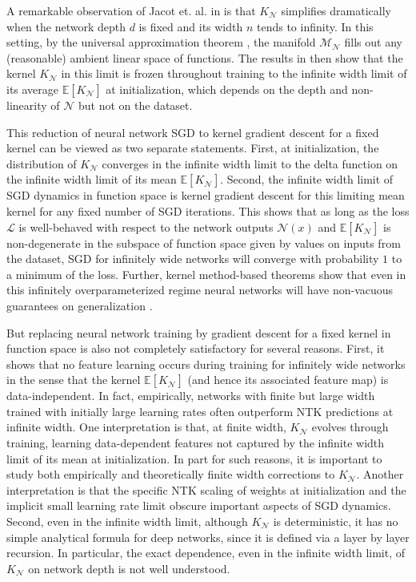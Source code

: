 \documentclass[11pt, reqno]{amsart}
\newcommand{\E}[1]{{\mathbb E}\left [#1\right]}
\newcommand{\mN}{\mathcal N}
\newcommand{\mM}{\mathcal M}
\begin{document}
A remarkable observation of Jacot et. al. in \cite{jacot2018neural} is that $K_{\mN}$ simplifies dramatically when the network depth $d$ is fixed and its width $n$ tends to infinity. In this setting, by the universal approximation theorem \cite{cybenko1989approximation,hornik1989multilayer}, the manifold $\mM_{\mN}$ fills out any (reasonable) ambient linear space of functions. The results in \cite{jacot2018neural} then show that the kernel $K_{\mN}$ in this limit is frozen throughout training to the infinite width limit of its average $\E{K_{\mN}}$ at initialization, which depends on the depth and non-linearity of $\mN$ but not on the dataset. 

This reduction of neural network SGD to kernel gradient descent for a fixed kernel can be viewed as two separate statements. First, at initialization, the distribution of $K_{\mN}$ converges in the infinite width limit to the delta function on the infinite width limit of its mean $\E{K_{\mN}}$. Second, the infinite width limit of SGD dynamics in function space is kernel gradient descent for this limiting mean kernel for any fixed number of SGD iterations. This shows that as long as the loss $\mathcal L$ is well-behaved with respect to the network outputs $\mN(x)$ and $\E{K_{\mN}}$ is non-degenerate in the subspace of function space given by values on inputs from the dataset, SGD for infinitely wide networks will  converge with probability $1$ to a minimum of the loss. Further, kernel method-based theorems show that even in this infinitely overparameterized regime neural networks will have non-vacuous guarantees on generalization \cite{wei2018regularization}. 

But replacing neural network training by gradient descent for a fixed kernel in function space is also not completely satisfactory for several reasons. First, it shows that no feature learning occurs during training for infinitely wide networks in the sense that the kernel $\E{K_{\mN}}$ (and hence its associated feature map) is data-independent. In fact, empirically, networks with finite but large width trained with initially large learning rates often outperform NTK predictions at infinite width. One interpretation is that, at finite width, $K_{\mN}$ evolves through training, learning data-dependent features not captured by the infinite width limit of its mean at initialization. In part for such reasons, it is important to study both empirically and theoretically finite width corrections to $K_{\mN}$. Another interpretation is that the specific NTK scaling of  weights at initialization \cite{chizat2018note,chizat2018global, mei2019mean, mei2018mean, rotskoff2018parameters, rotskoff2018neural} and the implicit small learning rate limit \cite{li2019towards} obscure important aspects of SGD dynamics. Second, even in the infinite width limit, although $K_{\mN}$ is deterministic, it has no simple analytical formula for deep networks, since it is defined via a layer by layer recursion. In particular, the exact dependence, even in the infinite width limit, of $K_{\mN}$ on network depth is not well understood.
\end{document}
